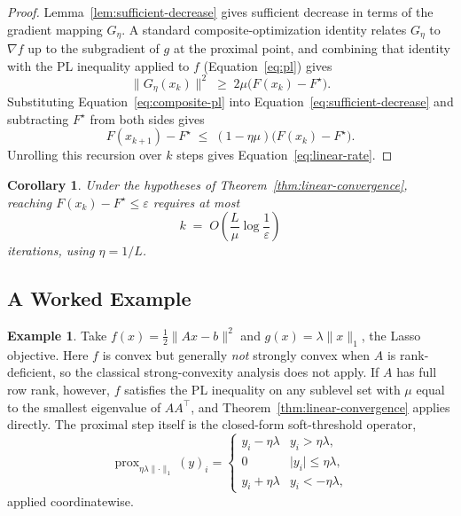 \documentclass[11pt]{article}
\newtheorem{corollary}[theorem]{Corollary}
\theoremstyle{definition}
\newtheorem{example}[theorem]{Example}
\theoremstyle{remark}
\DeclareMathOperator{\prox}{prox}
\begin{document}
\begin{proof}
Lemma~\ref{lem:sufficient-decrease} gives sufficient decrease in terms of
the gradient mapping $G_\eta$. A standard composite-optimization
identity relates $G_\eta$ to $\nabla f$ up to the subgradient of $g$ at
the proximal point, and combining that identity with the PL inequality
applied to $f$ (Equation~\eqref{eq:pl}) gives
\begin{equation}
  \label{eq:composite-pl}
  \lVert G_\eta(x_k) \rVert^2 \;\ge\; 2\mu \bigl(F(x_k) - F^\star\bigr).
\end{equation}
Substituting Equation~\eqref{eq:composite-pl} into
Equation~\eqref{eq:sufficient-decrease} and subtracting $F^\star$ from
both sides gives
\begin{equation}
  F(x_{k+1}) - F^\star \;\le\; (1 - \eta\mu)\bigl(F(x_k) - F^\star\bigr).
\end{equation}
Unrolling this recursion over $k$ steps gives
Equation~\eqref{eq:linear-rate}.
\end{proof}

\begin{corollary}
\label{cor:iteration-complexity}
Under the hypotheses of Theorem~\ref{thm:linear-convergence}, reaching
$F(x_k) - F^\star \le \varepsilon$ requires at most
\begin{equation}
  k \;=\; O\!\left( \frac{L}{\mu} \log\frac{1}{\varepsilon} \right)
\end{equation}
iterations, using $\eta = 1/L$.
\end{corollary}

\subsection{A Worked Example}
\label{sec:example}

\begin{example}
\label{ex:lasso}
Take $f(x) = \frac{1}{2}\lVert Ax - b \rVert^2$ and $g(x) = \lambda \lVert x \rVert_1$,
the Lasso objective. Here $f$ is convex but generally \emph{not}
strongly convex when $A$ is rank-deficient, so the classical strong-convexity
analysis does not apply. If $A$ has full row rank, however, $f$
satisfies the PL inequality on any sublevel set with $\mu$ equal to the
smallest eigenvalue of $AA^\top$, and Theorem~\ref{thm:linear-convergence}
applies directly. The proximal step itself is the closed-form
soft-threshold operator,
\begin{equation}
  \prox_{\eta \lambda \lVert \cdot \rVert_1}(y)_i =
  \begin{cases}
    y_i - \eta\lambda & y_i > \eta\lambda, \\
    0 & \lvert y_i \rvert \le \eta\lambda, \\
    y_i + \eta\lambda & y_i < -\eta\lambda,
  \end{cases}
\end{equation}
applied coordinatewise.
\end{example}
\end{document}
